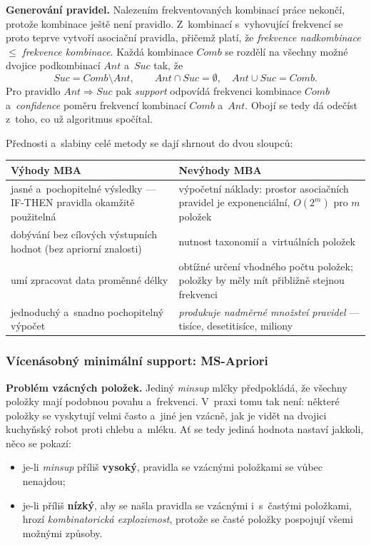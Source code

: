 \documentclass[11pt,a4paper]{article}
\theoremstyle{definition}
\begin{document}
\textbf{Generování pravidel.} Nalezením frekventovaných kombinací práce nekončí, protože
kombinace ještě není pravidlo. Z~kombinací s~vyhovující frekvencí se proto teprve vytvoří
asociační pravidla, přičemž platí, že \emph{frekvence nadkombinace} $\le$ \emph{frekvence
kombinace}. Každá kombinace $\mathit{Comb}$ se rozdělí na všechny možné dvojice podkombinací
$\mathit{Ant}$ a~$\mathit{Suc}$ tak, že
\[ \mathit{Suc}=\mathit{Comb}\setminus \mathit{Ant},\qquad
   \mathit{Ant}\cap \mathit{Suc}=\emptyset,\quad \mathit{Ant}\cup \mathit{Suc}=\mathit{Comb}. \]
Pro pravidlo $\mathit{Ant}\Rightarrow \mathit{Suc}$ pak \emph{support} odpovídá frekvenci
kombinace $\mathit{Comb}$ a~\emph{confidence} poměru frekvencí kombinací $\mathit{Comb}$
a~$\mathit{Ant}$. Obojí se tedy dá odečíst z~toho, co už algoritmus spočítal.

Přednosti a~slabiny celé metody se dají shrnout do dvou sloupců:

\begin{center}
\small
\begin{tabular}{@{}p{7.6cm}p{8.0cm}@{}}
\toprule
\textbf{Výhody MBA} & \textbf{Nevýhody MBA} \\
\midrule
jasné a~pochopitelné výsledky --- IF-THEN pravidla okamžitě použitelná & výpočetní náklady:
  prostor asociačních pravidel je exponenciální, $O(2^m)$ pro $m$ položek \\
dobývání bez cílových výstupních hodnot (bez apriorní znalosti) & nutnost taxonomií
  a~virtuálních položek \\
umí zpracovat data proměnné délky & obtížné určení vhodného počtu položek; položky by měly
  mít přibližně stejnou frekvenci \\
jednoduchý a~snadno pochopitelný výpočet & \emph{produkuje nadměrné množství pravidel} ---
  tisíce, desetitisíce, miliony \\
\bottomrule
\end{tabular}
\end{center}

\subsubsection{Vícenásobný minimální support: MS-Apriori}

\textbf{Problém vzácných položek.} Jediný \emph{minsup} mlčky předpokládá, že všechny položky
mají podobnou povahu a~frekvenci. V~praxi tomu tak není: některé položky se vyskytují velmi
často a~jiné jen vzácně, jak je vidět na dvojici kuchyňský robot proti chlebu a~mléku. Ať se
tedy jediná hodnota nastaví jakkoli, něco se pokazí:
\begin{itemize}
\item je-li \emph{minsup} příliš \textbf{vysoký}, pravidla se vzácnými položkami se vůbec
      nenajdou;
\item je-li příliš \textbf{nízký}, aby se našla pravidla se vzácnými i~s~častými položkami,
      hrozí \emph{kombinatorická explozivnost}, protože se časté položky pospojují všemi
      možnými způsoby.
\end{itemize}
\end{document}
